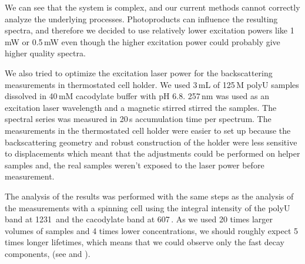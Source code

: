 \begin{table}
	\centering
	
	\caption[%
		Lifetimes of the polyU in dependence on excitation power estimated from
		the background-corrected spectra.%
	]{%
		$E_0$ are total energies accumulated by detector divided by maximal value
		across all the excitation powers $P$, and $E$ are energies accumulated from
		the time $T = 60\pm20$\,s, which was needed for the adjustment of the
		samples before the acquisition can even start, but the sample needs to
		be irradiated by the excitation laser.
		The last column contains fractions of the samples $r$ that were not
		destroyed by photodecomposition after time $T$.
	}
	\label{\tablabel{power_optim:lifetimes_triplexes2}}
\end{table}

We can see that the system is complex, and our current methods cannot correctly
analyze the underlying processes.
Photoproducts can influence the resulting spectra, and therefore we
decided to use relatively lower excitation powers like 1\,mW or 0.5\,mW even
though the higher excitation power could probably give higher quality spectra.

We also tried to optimize the excitation laser power for the backscattering
measurements in thermostated cell holder.
We used 3\,mL of 125\,M polyU samples dissolved in 40\,mM cacodylate
buffer with pH 6.8.
257\,nm was used as an excitation laser wavelength and a magnetic stirred
stirred the samples.
The spectral series was measured in 20\,s accumulation time per
spectrum.
The measurements in the thermostated cell holder were easier to set up
because the backscattering geometry and robust construction of the holder
were less sensitive to displacements which meant that the adjustments could be
performed on helper samples and, the real samples weren't exposed to the
laser power before measurement.

The analysis of the results was performed with the same steps as the analysis
of the measurements with a spinning cell using the integral intensity of the
polyU band at 1231\,\icm{} and the cacodylate band at 607\,\icm{}.
As we used 20 times
larger volumes of samples and 4 times lower concentrations, we should roughly
expect 5 times longer lifetimes, which means that we could observe only the
fast decay components, (see
and
).

